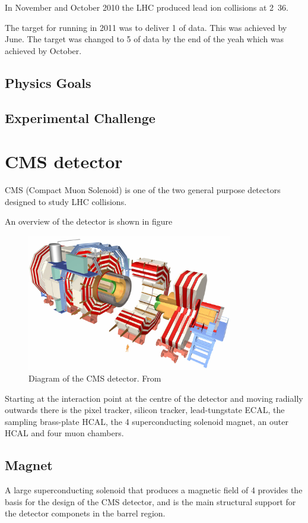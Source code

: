 In November and October 2010 the LHC produced lead ion collisions at
\unit{2.36}{\TeV}.

The target for running in 2011 was to deliver \unit{1}{\invfb} of data. This was
achieved by June. The target was changed to \unit{5}{\invfb} of data by the end
of the yeah which was achieved by October.

\subsection{Physics Goals}

\subsection{Experimental Challenge}


\section{CMS detector}
CMS (Compact Muon Solenoid)\cite{cms} is one of the two general purpose
detectors designed to study LHC collisions. 

An overview of the detector is shown in figure 
\begin{figure}[htb!]
  \centering
  \includegraphics[width=0.8\textwidth]{CMSnc}
  \caption{Diagram of the CMS detector. From \cite{cms}}
  \label{fig:CMSnc}
\end{figure}

Starting at the interaction point at the centre of the detector and moving
radially outwards there is the pixel tracker, silicon tracker, lead-tungstate
ECAL, the sampling brass-plate HCAL, the \unit{4}{\tesla} superconducting
solenoid magnet, an outer HCAL and four muon chambers.

\subsection{Magnet}
A large superconducting solenoid that produces a magnetic field of
\unit{4}{\tesla} provides the basis for the design of the CMS detector, and is
the main structural support for the detector componets in the barrel region.

